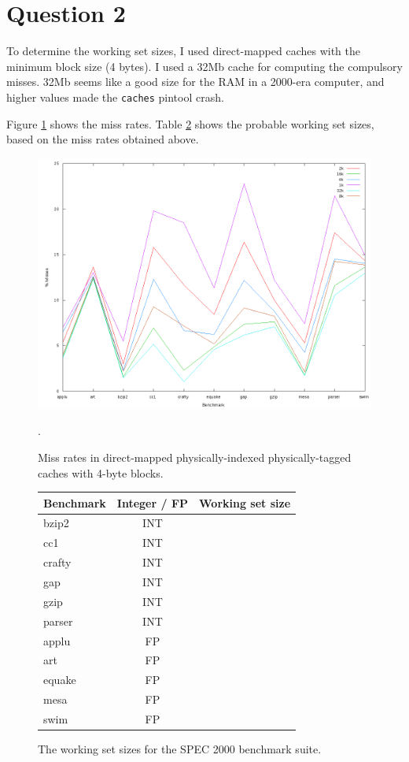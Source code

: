 \section{Question 2}
To determine the working set sizes, I used direct-mapped caches with the
minimum block size (4 bytes). I used a 32Mb cache for computing the compulsory
misses. 32Mb seems like a good size for the RAM in a 2000-era computer, and
higher values made the \texttt{caches} pintool crash.

Figure \ref{q2:miss_rates} shows the miss rates. Table \ref{q2:working_set}
shows the probable working set sizes, based on the miss rates obtained above.

\begin{figure}[htb]
  \includegraphics[width=6.8in]{6.823/lab2/figs/working_set.png}
  \caption{Miss rates in direct-mapped physically-indexed physically-tagged
  caches with 4-byte blocks. }
  \label{q2:miss_rates}.
\end{figure}

\begin{figure}[htb]
\center

\begin{tabular}{lcr}
\hline
Benchmark & Integer / FP & Working set size \\
\hline
bzip2 & INT & \\
cc1 & INT & \\
crafty & INT & \\
gap & INT & \\
gzip & INT & \\
parser & INT & \\
\hline
applu & FP & \\
art & FP & \\
equake & FP & \\
mesa & FP & \\
swim & FP & \\
\hline
\end{tabular}

\caption{The working set sizes for the SPEC 2000 benchmark suite. }
\label{q2:working_set}
\end{figure}

